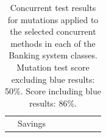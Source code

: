 \documentclass[a4paper,12pt]{article}
\begin{document}
\begin{table}[hp!]
\begin{tabular}{lcllllll}
\multicolumn{1}{c|}{\textbf{}}                                                                                   & \multicolumn{1}{c|}{Savings}   & \multicolumn{1}{l|}{\cellcolor[HTML]{31A4FF}} & \multicolumn{1}{l|}{\cellcolor[HTML]{32CB00}} & \multicolumn{1}{l|}{\cellcolor[HTML]{FFFFFF}} & \multicolumn{1}{l|}{\cellcolor[HTML]{32CB00}} & \multicolumn{1}{l|}{\cellcolor[HTML]{31A4FF}} & \multicolumn{1}{l|}{\cellcolor[HTML]{FFFFFF}} \\ \cline{2-8} 
\end{tabular}
\caption{Concurrent test results for mutations applied to the selected concurrent methods in each of the Banking system classes. Mutation test score excluding blue results: 50\%. Score including blue results: 86\%.}
\label{table:banking_all_classes_results}
\end{table}
\end{document}
